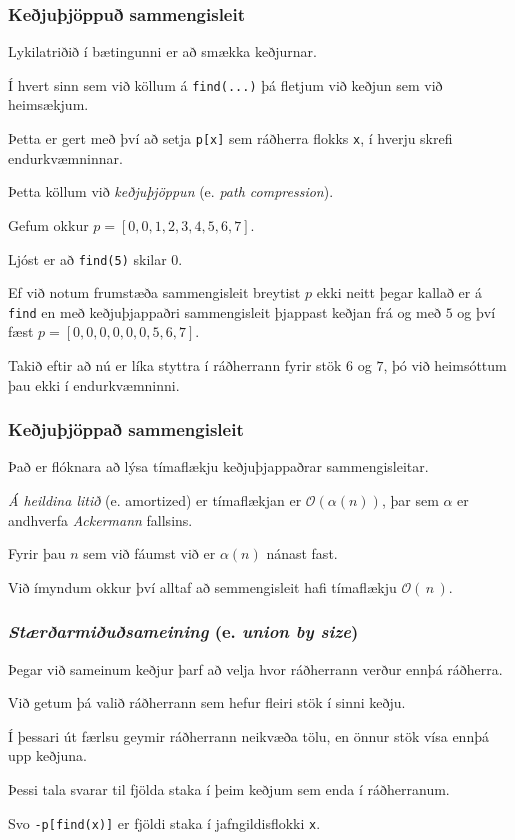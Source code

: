 {
	\frametitle{Keðjuþjöppuð sammengisleit}
	{
		\item<1-> Lykilatriðið í bætingunni er að smækka keðjurnar.
		\item<2-> Í hvert sinn sem við köllum á \texttt{find(...)} þá fletjum við keðjun sem við heimsækjum.
		\item<3-> Þetta er gert með því að setja \texttt{p[x]} sem ráðherra flokks \texttt{x}, í hverju skrefi endurkvæmninnar.
		\item<4-> Þetta köllum við \emph{keðjuþjöppun} (e. \emph{path compression}).
	}
}

{
	{
		\item<1-> Gefum okkur
			$p = [0, 0, 1, 2, 3, 4, 5, 6, 7]$.
		\item<2-> Ljóst er að \texttt{find(5)} skilar $0$.
		\item<3-> Ef við notum frumstæða sammengisleit breytist $p$ ekki neitt þegar kallað er á \texttt{find}
			en með keðjuþjappaðri sammengisleit þjappast keðjan frá og með $5$ og því fæst
			$p = [0, 0, 0, 0, 0, 0, 5, 6, 7]$.
		\item<4-> Takið eftir að nú er líka styttra í ráðherrann fyrir stök $6$ og $7$, þó við heimsóttum þau ekki í endurkvæmninni.
	}
}

{
	\frametitle{Keðjuþjöppað sammengisleit}
}

{
	{
		\item<1-> Það er flóknara að lýsa tímaflækju keðjuþjappaðrar sammengisleitar.
		\item<2-> \emph{Á heildina litið} (e. amortized) er tímaflækjan er $\mathcal{O}(\alpha(n))$,
					þar sem $\alpha$ er andhverfa \emph{Ackermann} fallsins.
		\item<3-> Fyrir þau $n$ sem við fáumst við er $\alpha(n)$ nánast fast.
		\item<4-> Við ímyndum okkur því alltaf að semmengisleit hafi tímaflækju $\mathcal{O}(\,n\,)$.
	}
}

{
	\frametitle{\emph{Stærðarmiðuðsameining} (e. \emph{union by size})}
	{
		\item<1-> Þegar við sameinum keðjur þarf að velja hvor ráðherrann verður ennþá ráðherra.
		\item<2-> Við getum þá valið ráðherrann sem hefur fleiri stök í sinni keðju.
		\item<3->[] 
		\item<4-> Í þessari út færlsu geymir ráðherrann neikvæða tölu, en önnur stök vísa ennþá upp keðjuna.
		\item<5-> Þessi tala svarar til fjölda staka í þeim keðjum sem enda í ráðherranum.
		\item<6-> Svo \texttt{-p[find(x)]} er fjöldi staka í jafngildisflokki \texttt{x}.
	}
}

{
}



